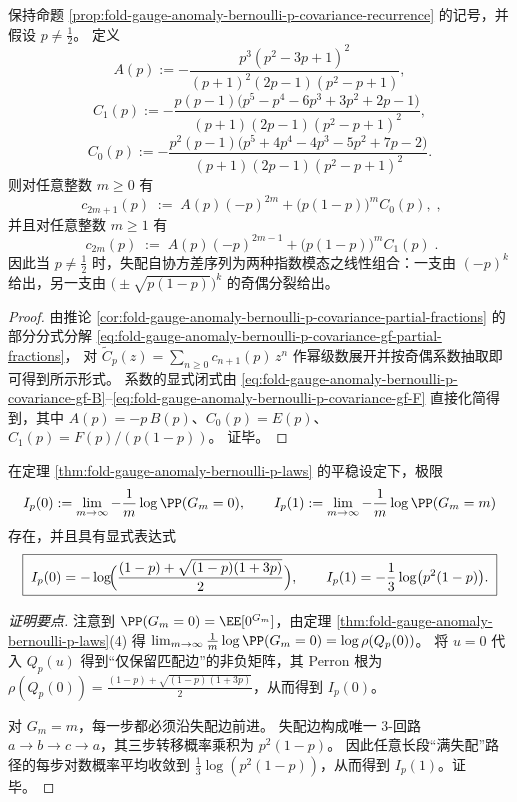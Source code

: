 \begin{corollary}\label{cor:fold-gauge-anomaly-bernoulli-p-covariance-explicit-even-odd}
保持命题 \ref{prop:fold-gauge-anomaly-bernoulli-p-covariance-recurrence} 的记号，并假设 \(p\neq\tfrac12\)。
定义
\[
A(p):=-\frac{p^3(p^2-3p+1)^2}{(p+1)^2(2p-1)(p^2-p+1)},
\]
\[
C_1(p):=-\frac{p(p-1)\bigl(p^5-p^4-6p^3+3p^2+2p-1\bigr)}{(p+1)(2p-1)(p^2-p+1)^2},
\]
\[
C_0(p):=-\frac{p^2(p-1)\bigl(p^5+4p^4-4p^3-5p^2+7p-2\bigr)}{(p+1)(2p-1)(p^2-p+1)^2}.
\]
则对任意整数 \(m\ge 0\) 有
\[
\boxed{\;
c_{2m+1}(p)\;:=\;A(p)(-p)^{2m}+\bigl(p(1-p)\bigr)^m C_0(p),
\;},
\]
并且对任意整数 \(m\ge 1\) 有
\[
\boxed{\;
c_{2m}(p)\;:=\;A(p)(-p)^{2m-1}+\bigl(p(1-p)\bigr)^m C_1(p)
\;}.
\]
因此当 \(p\neq\tfrac12\) 时，失配自协方差序列为两种指数模态之线性组合：一支由 \((-p)^k\) 给出，另一支由 \(\bigl(\pm\sqrt{p(1-p)}\bigr)^k\) 的奇偶分裂给出。
\end{corollary}
\begin{proof}
由推论 \ref{cor:fold-gauge-anomaly-bernoulli-p-covariance-partial-fractions} 的部分分式分解 \eqref{eq:fold-gauge-anomaly-bernoulli-p-covariance-gf-partial-fractions}，
对 \(\widetilde C_p(z)=\sum_{n\ge 0}c_{n+1}(p)\,z^n\) 作幂级数展开并按奇偶系数抽取即可得到所示形式。
系数的显式闭式由 \eqref{eq:fold-gauge-anomaly-bernoulli-p-covariance-gf-B}--\eqref{eq:fold-gauge-anomaly-bernoulli-p-covariance-gf-F} 直接化简得到，其中
\(
A(p)=-p\,B(p)
\)、\(
C_0(p)=E(p)
\)、\(
C_1(p)=F(p)/(p(1-p))
\)。
证毕。
\end{proof}

\begin{proposition}\label{prop:fold-gauge-anomaly-bernoulli-p-endpoint-ldp}
在定理 \ref{thm:fold-gauge-anomaly-bernoulli-p-laws} 的平稳设定下，极限
\[
I_p(0):=\lim_{m\to\infty}-\frac{1}{m}\log \PP(G_m=0),
\qquad
I_p(1):=\lim_{m\to\infty}-\frac{1}{m}\log \PP(G_m=m)
\]
存在，并且具有显式表达式
\begin{equation}\label{eq:fold-gauge-anomaly-bernoulli-p-endpoint-rates}
\boxed{\;
I_p(0)=-\log\!\Bigl(\frac{(1-p)+\sqrt{(1-p)(1+3p)}}{2}\Bigr),
\qquad
I_p(1)=-\frac13\log\bigl(p^2(1-p)\bigr).\;}
\end{equation}
\end{proposition}
\begin{proof}[证明要点]
注意到 \(\PP(G_m=0)=\EE[0^{G_m}]\)，由定理 \ref{thm:fold-gauge-anomaly-bernoulli-p-laws}(4) 得
\(
\lim_{m\to\infty}\frac{1}{m}\log \PP(G_m=0)=\log\rho(Q_p(0))
\)。
将 \(u=0\) 代入 \(Q_p(u)\) 得到“仅保留匹配边”的非负矩阵，其 Perron 根为
\(\rho(Q_p(0))=\frac{(1-p)+\sqrt{(1-p)(1+3p)}}{2}\)，从而得到 \(I_p(0)\)。
\par
对 \(G_m=m\)，每一步都必须沿失配边前进。
失配边构成唯一 \(3\)-回路 \(a\to b\to c\to a\)，其三步转移概率乘积为 \(p^2(1-p)\)。
因此任意长段“满失配”路径的每步对数概率平均收敛到 \(\frac13\log(p^2(1-p))\)，从而得到 \(I_p(1)\)。证毕。
\end{proof}

